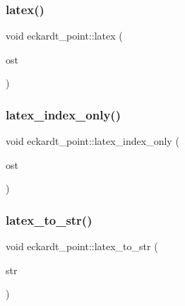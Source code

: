\subsubsection{\texorpdfstring{latex()}{latex()}}
{\footnotesize\ttfamily void eckardt\+\_\+point\+::latex (\begin{DoxyParamCaption}\item[{ostream \&}]{ost }\end{DoxyParamCaption})}

\mbox{\label{classeckardt__point_af8fdbe7105921bd80a717cbdaae00e87}} 
\subsubsection{\texorpdfstring{latex\+\_\+index\+\_\+only()}{latex\_index\_only()}}
{\footnotesize\ttfamily void eckardt\+\_\+point\+::latex\+\_\+index\+\_\+only (\begin{DoxyParamCaption}\item[{ostream \&}]{ost }\end{DoxyParamCaption})}

\mbox{\label{classeckardt__point_a1c2ba0333f556cc0db508691c77ec614}} 
\subsubsection{\texorpdfstring{latex\+\_\+to\+\_\+str()}{latex\_to\_str()}}
{\footnotesize\ttfamily void eckardt\+\_\+point\+::latex\+\_\+to\+\_\+str (\begin{DoxyParamCaption}\item[{\mbox{\hyperlink{galois_8h_ab6cc7b4aeb6ea31aba2b3fbfc83ff5e6}{B\+Y\+TE}} $\ast$}]{str }\end{DoxyParamCaption})}

\mbox{\label{classeckardt__point_af6996611233582f1c94d5226a34c59e3}} 
